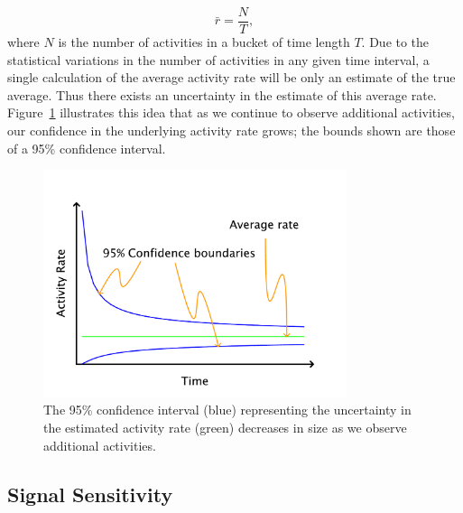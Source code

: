 \documentclass{article}
\begin{document}
\begin{equation}
    \label{eq:rateEst}
    \bar{r} = \frac{N}{T},
\end{equation}
where $N$ is the number of activities in a bucket of time length $T$.  Due to
the statistical variations in the number of activities in any given time
interval, a single calculation of the average activity rate will be only an
estimate of the true average.  Thus there exists an uncertainty in the estimate
of this average rate.  Figure~\ref{fig:confidence} illustrates this idea that
as we continue to observe additional activities, our confidence in the
underlying activity rate grows; the bounds shown are those of a 95\% confidence
interval.



%
\begin{figure}[h]
	\begin{center}
		\includegraphics[width=3.5in]{./imgs/fig2.pdf}
	\end{center}
	\caption{The 95\% confidence interval (blue) representing the uncertainty in the estimated activity 
		rate (green) decreases in size as we observe additional activities. }
    	\label{fig:confidence}
\end{figure}
%
%

%


\subsection{Signal Sensitivity}
\label{sens}
\end{document}
